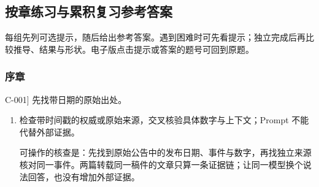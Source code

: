 \subsection{按章练习与累积复习参考答案}
\label{app:answers}
每组先列可选提示，随后给出参考答案。遇到困难时可先看提示；独立完成后再比较推导、结果与形状。电子版点击提示或答案的题号可回到原题。
\subsubsection*{序章}
\begin{answerhints}
\item[\hyperref[exercise:verify-generated-news]{C-001}] \leavevmode{}\label{hint:verify-generated-news}先找带日期的原始出处。
\end{answerhints}
\begin{enumerate}[label={},leftmargin=4.8em,itemsep=4pt]
\item[\textbf{\hyperref[exercise:verify-generated-news]{C-001.}}] \leavevmode{}\label{solution:C-001}\label{solution:verify-generated-news}检查带时间戳的权威或原始来源，交叉核验具体数字与上下文；Prompt 不能代替外部证据。\par 可操作的核查是：先找到原始公告中的发布日期、事件与数字，再找独立来源核对同一事件。两篇转载同一稿件的文章只算一条证据链；让同一模型换个说法回答，也没有增加外部证据。
\end{enumerate}
